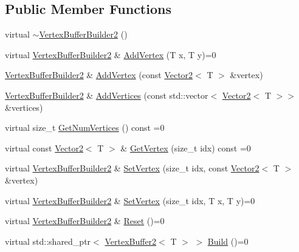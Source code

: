 \subsection*{Public Member Functions}
\begin{DoxyCompactItemize}
\item 
virtual \hyperlink{classastu_1_1VertexBufferBuilder2_a811979f1ea54191c4974b122b0e54999}{$\sim$\+Vertex\+Buffer\+Builder2} ()
\item 
virtual \hyperlink{classastu_1_1VertexBufferBuilder2}{Vertex\+Buffer\+Builder2} \& \hyperlink{classastu_1_1VertexBufferBuilder2_ab96f2f382b9f855ead02ed2cd1391147}{Add\+Vertex} (T x, T y)=0
\item 
\hyperlink{classastu_1_1VertexBufferBuilder2}{Vertex\+Buffer\+Builder2} \& \hyperlink{classastu_1_1VertexBufferBuilder2_a7c9aeca470b92d3170c3558f924b79e3}{Add\+Vertex} (const \hyperlink{classastu_1_1Vector2}{Vector2}$<$ T $>$ \&vertex)
\item 
\hyperlink{classastu_1_1VertexBufferBuilder2}{Vertex\+Buffer\+Builder2} \& \hyperlink{classastu_1_1VertexBufferBuilder2_ab79d03bea65cb06b7a2af64fc6fd704b}{Add\+Vertices} (const std\+::vector$<$ \hyperlink{classastu_1_1Vector2}{Vector2}$<$ T $>$$>$ \&vertices)
\item 
virtual size\+\_\+t \hyperlink{classastu_1_1VertexBufferBuilder2_ae715cb61f66200f1971b2bd6142b1715}{Get\+Num\+Vertices} () const =0
\item 
virtual const \hyperlink{classastu_1_1Vector2}{Vector2}$<$ T $>$ \& \hyperlink{classastu_1_1VertexBufferBuilder2_ae9ecf15e9ddafcdac089ebe61e37a242}{Get\+Vertex} (size\+\_\+t idx) const =0
\item 
virtual \hyperlink{classastu_1_1VertexBufferBuilder2}{Vertex\+Buffer\+Builder2} \& \hyperlink{classastu_1_1VertexBufferBuilder2_a36eb7c96971e245110f9674779323666}{Set\+Vertex} (size\+\_\+t idx, const \hyperlink{classastu_1_1Vector2}{Vector2}$<$ T $>$ \&vertex)
\item 
virtual \hyperlink{classastu_1_1VertexBufferBuilder2}{Vertex\+Buffer\+Builder2} \& \hyperlink{classastu_1_1VertexBufferBuilder2_aad6f4a82b30b026ee7140b88edb053b2}{Set\+Vertex} (size\+\_\+t idx, T x, T y)=0
\item 
virtual \hyperlink{classastu_1_1VertexBufferBuilder2}{Vertex\+Buffer\+Builder2} \& \hyperlink{classastu_1_1VertexBufferBuilder2_a13de4c923fb8e44b99f6cd36430dd369}{Reset} ()=0
\item 
virtual std\+::shared\+\_\+ptr$<$ \hyperlink{classastu_1_1VertexBuffer2}{Vertex\+Buffer2}$<$ T $>$ $>$ \hyperlink{classastu_1_1VertexBufferBuilder2_a69ce65106844f82fcc34632bfa0d6450}{Build} ()=0
\end{DoxyCompactItemize}


